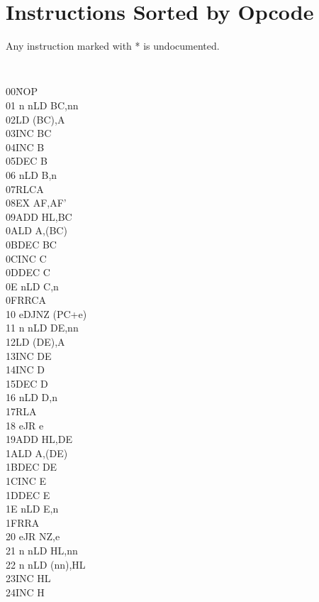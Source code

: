 \documentclass[oneside,a4paper]{book}
\begin{document}
\chapter{Instructions Sorted by Opcode}

Any instruction marked with * is undocumented.
\begin{multicols}{3}

\scriptsize
{\tt
\begin{tabbing}
00{\qquad}{\qquad}{\quad}\=NOP\\
01 n n\>LD BC,nn\\
02\>LD (BC),A\\
03\>INC BC\\
04\>INC B\\
05\>DEC B\\
06 n\>LD B,n\\
07\>RLCA\\
08\>EX AF,AF'\\
09\>ADD HL,BC\\
0A\>LD A,(BC)\\
0B\>DEC BC\\
0C\>INC C\\
0D\>DEC C\\
0E n\>LD C,n\\
0F\>RRCA\\
10 e\>DJNZ (PC+e)\\
11 n n\>LD DE,nn\\
12\>LD (DE),A\\
13\>INC DE\\
14\>INC D\\
15\>DEC D\\
16 n\>LD D,n\\
17\>RLA\\
18 e\>JR e\\
19\>ADD HL,DE\\
1A\>LD A,(DE)\\
1B\>DEC DE\\
1C\>INC E\\
1D\>DEC E\\
1E n\>LD E,n\\
1F\>RRA\\
20 e\>JR NZ,e\\
21 n n\>LD HL,nn\\
22 n n\>LD (nn),HL\\
23\>INC HL\\
24\>INC H\\

\end{tabbing}}
\end{multicols}
\end{document}
